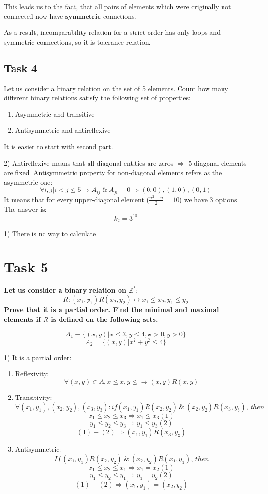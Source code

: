 This leads us to the fact, that all pairs of elements which were originally not connected now have \textbf{symmetric} connetions.

As a result, incomparability relation for a strict order has only loops and symmetric connections, so it is tolerance relation.
\subsection{Task 4}

Let us consider a binary relation on the set of 5 elements. Count how many different
binary relations satisfy the following set of properties:

\begin{enumerate}
\item Asymmetric and transitive
\item Antisymmetric and antireflexive
\end{enumerate}

It is easier to start with second part.

2) Antireflexive means that all diagonal entities are zeros $\Rightarrow$ 5 diagonal elements are fixed.
Antisymmetric property for non-diagonal elements refers as the asymmetric one:
\[  \forall i,j | i < j \leq 5 \Rightarrow A_{ij}\ \& \ A_{ji} = 0 \Rightarrow (0,0), (1,0), (0,1)  \]
It means that for every upper-diagonal element ($\frac{n^2-n}{2}=10$)  we have 3 options.
The answer is:
\[ k_2=3^{10} \]

1) There is no way to calculate 

\section{Task 5}

\begin{center}
\textbf{Let us consider a binary relation on $\mathbb{Z}^2$}:
\[ R : (x_1, y_1)R(x_2, y_2) \leftrightarrow x_1 \leq x_2, y_1 \leq y_2 \]
\textbf{Prove that it is a partial order.
Find the minimal and maximal elements if $R$ is defined on the following sets:}

\[ A_1 = \{ (x,y) | x \leq 3, y \leq 4, x > 0, y > 0 \} \]
\[ A_2 = \{ (x,y) | x^2 + y^2 \leq 4 \} \]
\end{center}

1) It is a partial order:

\begin{enumerate}
\item Reflexivity:
\[ \forall (x,y) \in A, x \leq x, y \leq \Rightarrow (x,y)R(x,y) \]
\item Transitivity:
\[ \forall (x_1, y_1), (x_2, y_2), (x_3, y_3): if (x_1,y_1)R(x_2,y_2)\ \& \ (x_2,y_2)R(x_3,y_3),\ then \]
\[ x_1 \leq x_2 \leq x_3 \Rightarrow x_1 \leq x_3 (1)\]
\[ y_1 \leq y_2 \leq y_3 \Rightarrow y_1 \leq y_3 (2)\]
\[ (1) + (2) \Rightarrow (x_1,y_1)R(x_3,y_3)\] 
\item Antisymmetric:
\[ If\ (x_1,y_1)R(x_2,y_2)\ \& \ (x_2,y_2)R(x_1,y_1),\ then \]
\[ x_1 \leq x_2 \leq x_1 \Rightarrow x_1=x_2 (1) \]
\[ y_1 \leq y_2 \leq y_1 \Rightarrow y_1=y_2 (2) \]
\[ (1)+(2) \Rightarrow (x_1,y_1) = (x_2, y_2) \]
\end{enumerate}

